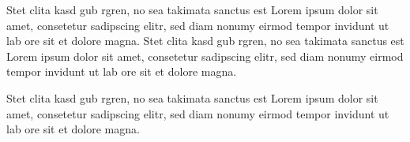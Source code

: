 Stet clita kasd gub rgren, no sea takimata sanctus est Lorem ipsum dolor sit amet, consetetur sadipscing elitr, sed diam nonumy eirmod tempor invidunt ut lab ore sit et dolore magna. Stet clita kasd gub rgren, no sea takimata sanctus est Lorem ipsum dolor sit amet, consetetur sadipscing elitr, sed diam nonumy eirmod tempor invidunt ut lab ore sit et dolore magna.

Stet clita kasd gub rgren, no sea takimata sanctus est Lorem ipsum dolor sit amet, consetetur sadipscing elitr, sed diam nonumy eirmod tempor invidunt ut lab ore sit et dolore magna.  